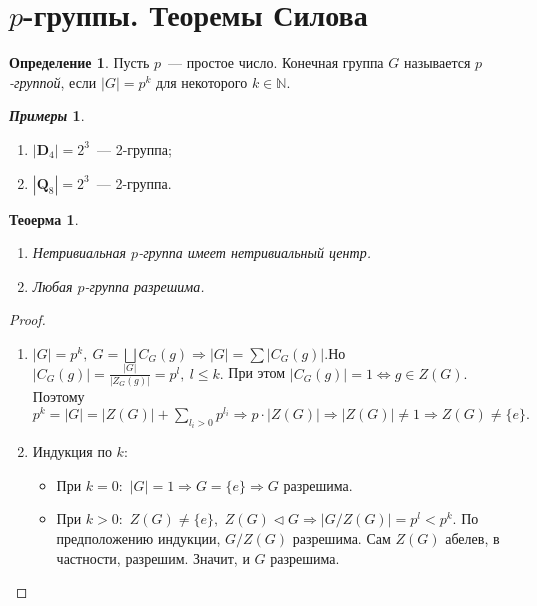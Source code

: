 \documentclass[a4paper, 14pt]{extarticle}
\newcommand{\naturals}{\mathbb{N}}
\newcommand{\dihedral}{\mathbf{D}}
\theoremstyle{definition}
\newtheorem*{exmpls}{\textit{Примеры}}
\newtheorem{definition}{Определение}
\theoremstyle{plain}
\newtheorem{theorem}{Теоерма}
\numberwithin{theorem}{section}
\numberwithin{definition}{section}
\numberwithin{statement}{section}
\numberwithin{lemma}{section}
\numberwithin{consequence}{section}
\begin{document}
	\section{$p$-группы. Теоремы Силова}
	\setcounter{definition}{0}
        \begin{definition}
            Пусть $p$~--- простое число. Конечная группа $G$ называется \textit{$p$-группой}, если ${|G| = p^k}$ для некоторого ${k \in \naturals.}$
        \end{definition}
        \begin{exmpls}
            \
            \begin{enumerate}
            \setlength\itemsep{0.1em}
                \item ${|\dihedral_4| = 2^3}$~--- 2-группа;
                \item ${|\mathbf{Q}_8| = 2^3}$~--- 2-группа.
            \end{enumerate}
        \end{exmpls}
        \begin{theorem}
            \
            \begin{enumerate}
            \setlength\itemsep{0.1em}
                \item Нетривиальная $p$-группа имеет нетривиальный центр. 
                \item Любая $p$-группа разрешима.
            \end{enumerate}
        \end{theorem}
        \begin{proof}
            \
            \begin{enumerate}
            \setlength\itemsep{0.1em}
                \item ${|G| = p^k, \ G = \bigsqcup C_G(g) \Rightarrow |G| = \displaystyle\sum|C_G(g)|.}$\newline Но ${|C_G(g)| = \frac{|G|}{|Z_G(g)|} = p^l, \ l \leqslant k.}$ При этом ${|C_G(g)| = 1 \Leftrightarrow g \in Z(G).}$ Поэтому ${p^k = |G| = |Z(G)| + \displaystyle\sum_{l_i > 0} p^{l_i} \Rightarrow p \cdot |Z(G)| \Rightarrow |Z(G)| \neq 1 \Rightarrow Z(G) \neq \{e\}.}$
                \item Индукция по $k$:
                \begin{itemize}
                \setlength\itemsep{0.1em}
                    \item При ${k = 0{:}}$ ${|G| = 1 \Rightarrow G = \{e\} \Rightarrow G}$ разрешима.
                    \item При ${k > 0{:}}$ ${Z(G) \neq \{e\},}$ ${Z(G) \lhd G \Rightarrow |G/Z(G)| = p^l < p^k.}$ По предположению
                    индукции, ${G/Z(G)}$ разрешима. Сам ${Z(G)}$ абелев, в частности, разрешим. Значит, и $G$ разрешима. \qedhere
                \end{itemize}
            \end{enumerate}
        \end{proof}
\end{document}
